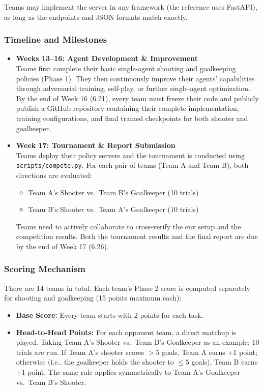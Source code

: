 \documentclass{article}
\begin{document}
Teams may implement the server in any framework (the reference uses FastAPI), as long as the endpoints and JSON formats match exactly.

\subsubsection{Timeline and Milestones}
\begin{itemize}
    \item \textbf{Weeks 13--16: Agent Development \& Improvement} \\
    Teams first complete their basic single-agent shooting and goalkeeping policies (Phase 1). They then continuously improve their agents' capabilities through adversarial training, self-play, or further single-agent optimization. By the end of Week 16 (6.21), every team must freeze their code and publicly publish a GitHub repository containing their complete implementation, training configurations, and final trained checkpoints for both shooter and goalkeeper.

    \item \textbf{Week 17: Tournament \& Report Submission} \\
    Teams deploy their policy servers and the tournament is conducted using \texttt{scripts/compete.py}. For each pair of teams (Team A and Team B), both directions are evaluated:
    \begin{itemize}
        \item Team A's Shooter vs.\ Team B's Goalkeeper (10 trials)
        \item Team B's Shooter vs.\ Team A's Goalkeeper (10 trials)
    \end{itemize}
    Teams need to actively collaborate to cross-verify the env setup and the competition results. Both the tournament results and the final report are due by the end of Week 17 (6.26).
\end{itemize}

\subsubsection{Scoring Mechanism}
There are 14 teams in total. Each team's Phase 2 score is computed separately for shooting and goalkeeping (15 points maximum each):

\begin{itemize}
    \item \textbf{Base Score:} Every team starts with 2 points for each task.
    \item \textbf{Head-to-Head Points:} For each opponent team, a direct matchup is played. Taking Team A's Shooter vs.\ Team B's Goalkeeper as an example: 10 trials are run. If Team A's shooter scores $>5$ goals, Team A earns +1 point; otherwise (i.e., the goalkeeper holds the shooter to $\le 5$ goals), Team B earns +1 point. The same rule applies symmetrically to Team A's Goalkeeper vs.\ Team B's Shooter.
\end{itemize}
\end{document}
